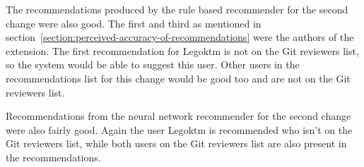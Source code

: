 The recommendations produced by the rule based recommender for the second change were also good. The first and third as mentioned in section~\ref{section:perceived-accuracy-of-recommendations} were the authors of the extension. The first recommendation for Legoktm is not on the Git reviewers list, so the system would be able to suggest this user. Other users in the recommendations list for this change would be good too and are not on the Git reviewers list.

Recommendations from the neural network recommender for the second change were also fairly good. Again the user Legoktm is recommended who isn't on the Git reviewers list, while both users on the Git reviewers list are also present in the recommendations.